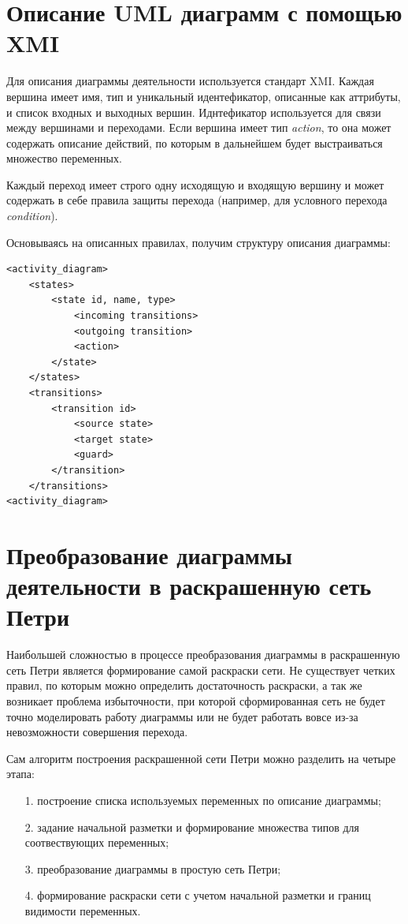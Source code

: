 \section{Описание UML диаграмм с помощью XMI}

Для описания диаграммы деятельности используется стандарт XMI. Каждая вершина имеет имя, тип и уникальный идентефикатор, описанные как аттрибуты, и список входных и выходных вершин. Иднтефикатор используется для связи между вершинами и переходами. Если вершина имеет тип \textit{action}, то она может содержать описание действий, по которым в дальнейшем будет выстраиваться множество переменных.

Каждый переход имеет строго одну исходящую и входящую вершину и может содержать в себе правила защиты перехода (например, для условного перехода \textit{condition}).

Основываясь на описанных правилах, получим структуру описания диаграммы:

\begin{lstlisting}[style=grammar,basicstyle=\small,caption={Структура XMI файла}]
<activity_diagram>
	<states>
		<state id, name, type>
			<incoming transitions>
			<outgoing transition>
			<action>
		</state>
	</states>
	<transitions>
		<transition id>
			<source state>
			<target state>
			<guard>
		</transition>
	</transitions>
<activity_diagram>
\end{lstlisting}

\section{Преобразование диаграммы деятельности в раскрашенную сеть Петри}

Наибольшей сложностью в процессе преобразования диаграммы в раскрашенную сеть Петри является формирование самой раскраски сети. Не существует четких правил, по которым можно определить достаточность раскраски, а так же возникает проблема избыточности, при которой сформированная сеть не будет точно моделировать работу диаграммы или не будет работать вовсе из-за невозможности совершения перехода.

Сам алгоритм построения раскрашенной сети Петри можно разделить на четыре этапа:

\begin{enumerate}
\item[1.] построение списка используемых переменных по описание диаграммы;
\item[2.] задание начальной разметки и формирование множества типов для соотвествующих переменных;
\item[3.] преобразование диаграммы в простую сеть Петри;
\item[4.] формирование раскраски сети с учетом начальной разметки и границ видимости переменных.
\end{enumerate}

